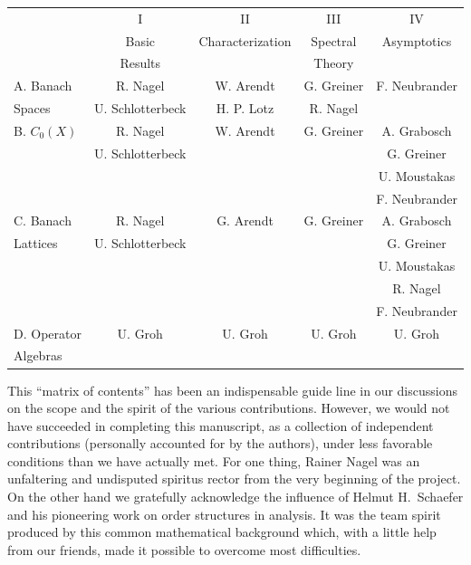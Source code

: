 \begin{table}[ht]
\centering
\begin{tabular}{l|c|c|c|c|}
\cline{2-5}
 & I & II & III & IV \\
 & Basic & Characterization & Spectral & Asymptotics \\
 & Results &  & Theory & \\
\hline
\multicolumn{1}{|l|}{A. Banach} & R. Nagel & W. Arendt & G. Greiner & F. Neubrander \\
\multicolumn{1}{|l|}{Spaces} & U. Schlotterbeck & H. P. Lotz & R. Nagel & \\
\hline
\multicolumn{1}{|l|}{B. $C_0(X)$} & R. Nagel & W. Arendt & G. Greiner & A. Grabosch \\
\multicolumn{1}{|l|}{} & U. Schlotterbeck & & & G. Greiner \\
\multicolumn{1}{|l|}{} & & & & U. Moustakas \\
\multicolumn{1}{|l|}{} & & & & F. Neubrander \\
\hline
\multicolumn{1}{|l|}{C. Banach} & R. Nagel & G. Arendt & G. Greiner & A. Grabosch \\
\multicolumn{1}{|l|}{Lattices} & U. Schlotterbeck & & & G. Greiner \\
\multicolumn{1}{|l|}{} & & & & U. Moustakas \\
\multicolumn{1}{|l|}{} & & & & R. Nagel \\
\multicolumn{1}{|l|}{} & & & & F. Neubrander \\
\hline
\multicolumn{1}{|l|}{D. Operator} & U. Groh & U. Groh & U. Groh & U. Groh \\
\multicolumn{1}{|l|}{Algebras} & & & & \\
\hline
\end{tabular}
\end{table}

This \enquote{matrix of contents} has been an indispensable guide line in our discussions on the scope and the spirit of the various contributions. 
However, we would not have succeeded in completing this manuscript, as a collection of independent contributions (personally accounted for by the authors), under less favorable conditions than we have actually met. 
For one thing, Rainer Nagel was an unfaltering and undisputed spiritus rector from the very beginning of the project. 
On the other hand we gratefully acknowledge the influence of Helmut H.~Schaefer and his pioneering work on order structures in analysis. 
It was the team spirit produced by this common mathematical background which, with a little help from our friends, made it possible to overcome most difficulties.

